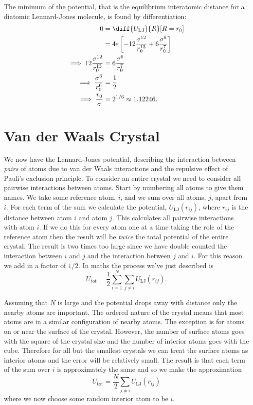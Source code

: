 \documentclass[fleqn]{NotesClass}
\newcommand*{\LJ}{\mathrm{LJ}}
\newcommand*{\tot}{\mathrm{tot}}
\begin{document}
    The minimum of the potential, that is the equilibrium interatomic distance for a diatomic Lennard-Jones molecule, is found by differentiation:
    \begin{align}
        0 &= \diff{U_{\LJ}}{R}[R=r_0]\\
        &= 4\varepsilon\left[ -12\frac{\sigma^{12}}{r_0^{13}} + 6\frac{\sigma^{6}}{r_0^{7}} \right]\\
        \implies 12\frac{\sigma^{12}}{r_0^{13}} &= 6\frac{\sigma^{6}}{r_0^{7}}\\
        \implies \frac{\sigma^{6}}{r_0^{6}} &= \frac{1}{2}\\
        \implies \frac{r_0}{\sigma} &= 2^{1/6} \approx 1.12246.
    \end{align}
    
    \section{Van der Waals Crystal}
    We now have the Lennard-Jones potential, describing the interaction between \emph{pairs} of atoms due to van der Waals interactions and the repulsive effect of Pauli's exclusion principle.
    To consider an entire crystal we need to consider all pairwise interactions between atoms.
    Start by numbering all atoms to give them names.
    We take some reference atom, \(i\), and we sum over all atoms, \(j\), apart from \(i\).
    For each term of the sum we calculate the potential, \(U_{\LJ}(r_{ij})\), where \(r_{ij}\) is the distance between atom \(i\) and atom \(j\).
    This calculates all pairwise interactions with atom \(i\).
    If we do this for every atom one at a time taking the role of the reference atom then the result will be \emph{twice} the total potential of the entire crystal.
    The result is two times too large since we have double counted the interaction between \(i\) and \(j\) and the interaction between \(j\) and \(i\).
    For this reason we add in a factor of \(1/2\).
    In maths the process we've just described is
    \begin{equation}
        U_{\tot} = \frac{1}{2}\sum_{i=1}^{N} \sum_{j\ne i} U_{\LJ}(r_{ij}).
    \end{equation}
    
    Assuming that \(N\) is large and the potential drops away with distance only the nearby atoms are important.
    The ordered nature of the crystal means that most atoms are in a similar configuration of nearby atoms.
    The exception is for atoms on or near the surface of the crystal.
    However, the number of surface atoms goes with the square of the crystal size and the number of interior atoms goes with the cube.
    Therefore for all but the smallest crystals we can treat the surface atoms as interior atoms and the error will be relatively small.
    The result is that each term of the sum over \(i\) is approximately the same and so we make the approximation
    \begin{equation}
        U_{\tot} = \frac{N}{2}\sum_{j\ne i} U_{\LJ}(r_{ij})
    \end{equation}
    where we now choose some random interior atom to be \(i\).
    
\end{document}
